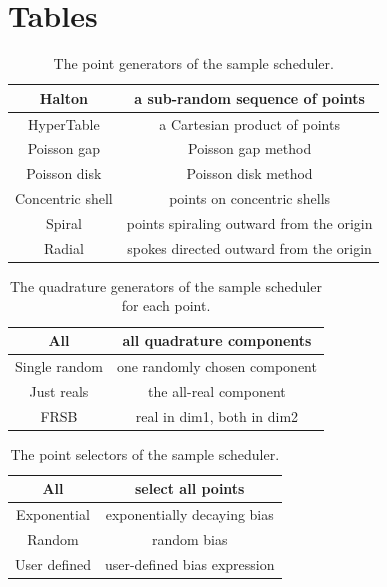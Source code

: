 \clearpage
\section{Tables}

\begin{table}[h]
  \begin{tabular}{ | c | c | }
    \hline
    Halton           &  a sub-random sequence of points             \\  \hline
    HyperTable       &  a Cartesian product of points               \\  \hline
    Poisson gap      &  Poisson gap method                          \\  \hline
    Poisson disk     &  Poisson disk method                         \\  \hline
    Concentric shell & points on concentric shells                  \\  \hline
    Spiral           &  points spiraling outward from the origin    \\  \hline
    Radial           &  spokes directed outward from the origin     \\  \hline
  \end{tabular}
  \caption{The point generators of the sample scheduler.}
  \label{scheduler_point_generators}
\end{table}

\begin{table}[h]
  \begin{tabular}{ | c | c | }
    \hline
    All             &  all quadrature components        \\  \hline
    Single random   &  one randomly chosen component    \\  \hline
    Just reals      &  the all-real component           \\  \hline
    FRSB            &  real in dim1, both in dim2       \\  \hline
  \end{tabular}
  \caption{The quadrature generators of the sample scheduler for each point.}
  \label{scheduler_quadrature_generators}
\end{table}

\begin{table}[h]
  \begin{tabular}{ | c | c | }
    \hline
    All             &  select all points            \\  \hline
    Exponential     &  exponentially decaying bias  \\  \hline
    Random          &  random bias                  \\  \hline
    User defined    &  user-defined bias expression \\  \hline
  \end{tabular}
  \caption{The point selectors of the sample scheduler.}
  \label{scheduler_point_selectors}
\end{table}


